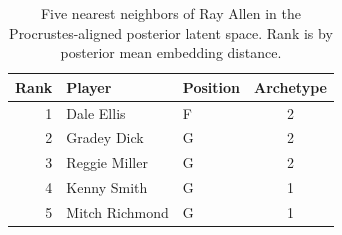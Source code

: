 \begin{table}[htbp]
  \centering\small
  \begin{tabular}{rllc}
    \toprule
    Rank & Player & Position & Archetype \\
    \midrule
    1 & Dale Ellis & F & 2 \\
    2 & Gradey Dick & G & 2 \\
    3 & Reggie Miller & G & 2 \\
    4 & Kenny Smith & G & 1 \\
    5 & Mitch Richmond & G & 1 \\
    \bottomrule
  \end{tabular}
  \caption{Five nearest neighbors of Ray Allen in the Procrustes-aligned posterior latent space. Rank is by posterior mean embedding distance.}
  \label{tab:Ray_Allen_neighbors}
\end{table}

